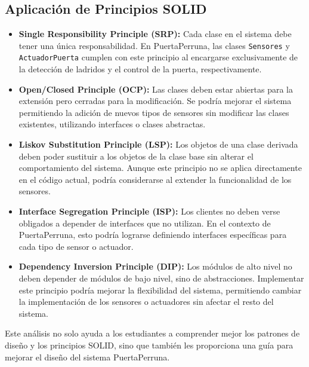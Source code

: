 \subsection{Aplicación de Principios SOLID}

\begin{itemize}
    \item \textbf{Single Responsibility Principle (SRP):} Cada clase en el sistema debe tener una única responsabilidad. En PuertaPerruna, las clases \texttt{Sensores} y \texttt{ActuadorPuerta} cumplen con este principio al encargarse exclusivamente de la detección de ladridos y el control de la puerta, respectivamente.
    
    \item \textbf{Open/Closed Principle (OCP):} Las clases deben estar abiertas para la extensión pero cerradas para la modificación. Se podría mejorar el sistema permitiendo la adición de nuevos tipos de sensores sin modificar las clases existentes, utilizando interfaces o clases abstractas.
    
    \item \textbf{Liskov Substitution Principle (LSP):} Los objetos de una clase derivada deben poder sustituir a los objetos de la clase base sin alterar el comportamiento del sistema. Aunque este principio no se aplica directamente en el código actual, podría considerarse al extender la funcionalidad de los sensores.
    
    \item \textbf{Interface Segregation Principle (ISP):} Los clientes no deben verse obligados a depender de interfaces que no utilizan. En el contexto de PuertaPerruna, esto podría lograrse definiendo interfaces específicas para cada tipo de sensor o actuador.
    
    \item \textbf{Dependency Inversion Principle (DIP):} Los módulos de alto nivel no deben depender de módulos de bajo nivel, sino de abstracciones. Implementar este principio podría mejorar la flexibilidad del sistema, permitiendo cambiar la implementación de los sensores o actuadores sin afectar el resto del sistema.
\end{itemize}

Este análisis no solo ayuda a los estudiantes a comprender mejor los patrones de diseño y los principios SOLID, sino que también les proporciona una guía para mejorar el diseño del sistema PuertaPerruna.